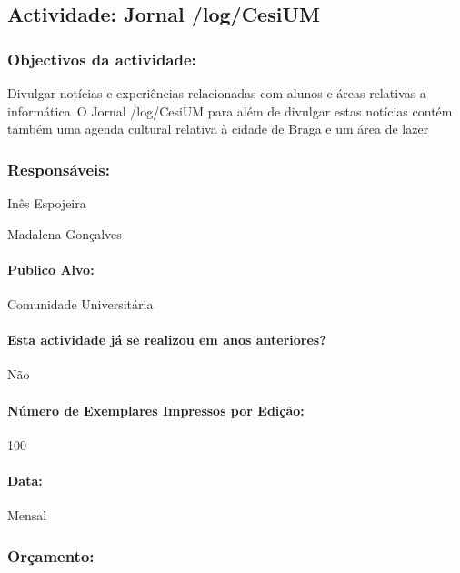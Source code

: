 \subsection*{Actividade: Jornal /log/CesiUM} 

\subsubsection*{Objectivos da actividade:}
\indent Divulgar notícias e experiências relacionadas com alunos e áreas relativas a informática\
\indent O Jornal /log/CesiUM para além de divulgar estas notícias contém também uma agenda cultural relativa à cidade de Braga e um área de lazer\\

\subsubsection*{Responsáveis:}
\begin{itemizedash}
	\item{Inês Espojeira}
	\item{Madalena Gonçalves}
\end{itemizedash}

\paragraph{Publico Alvo: }
Comunidade Universitária

\paragraph{Esta actividade já se realizou em anos anteriores?}
Não

\paragraph{Número de Exemplares Impressos por Edição:}
100

\paragraph{Data:} Mensal

\subsubsection*{Orçamento:}

